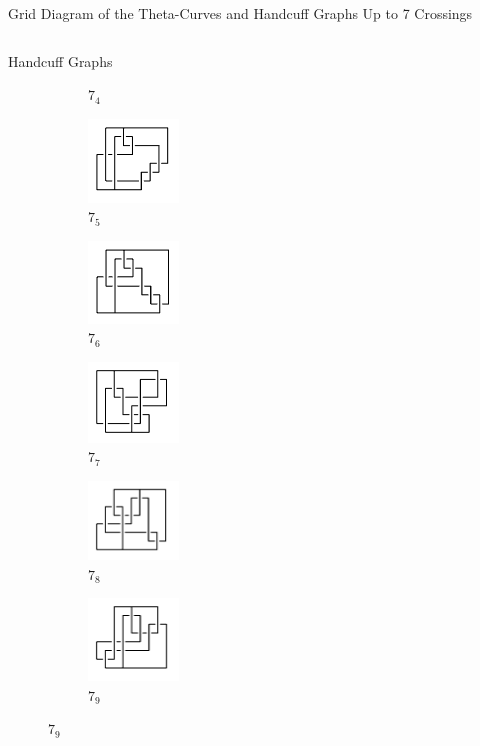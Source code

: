 \documentclass[final]{beamer}
\begin{document}
\begin{frame}[t]
\begin{alertblock}{Grid Diagram of the Theta-Curves and Handcuff Graphs Up to 7 Crossings}
\begin{columns}[t]
\begin{column}{0.3\textwidth}
\begin{alertblock}{Handcuff Graphs}
\begin{figure}
\begin{subfigure}{0.15\textwidth}
    \caption{$7_{4}$} 
    \end{subfigure}
    \begin{subfigure}{0.15\textwidth}
    \includegraphics[width=2.4cm]{../Midterm_Poster/grid_diagram/handcuff_7_5.png}
    \caption{$7_{5}$} 
    \end{subfigure}
    \begin{subfigure}{0.15\textwidth}
    \includegraphics[width=2.4cm]{../Midterm_Poster/grid_diagram/handcuff_7_6.png}
    \caption{$7_{6}$} 
    \end{subfigure}
    \begin{subfigure}{0.15\textwidth}
    \includegraphics[width=2.4cm]{../Midterm_Poster/grid_diagram/handcuff_7_7.png}
    \caption{$7_{7}$} 
    \end{subfigure}
    \begin{subfigure}{0.15\textwidth}
    \includegraphics[width=2.4cm]{../Midterm_Poster/grid_diagram/handcuff_7_8.png}
    \caption{$7_{8}$} 
    \end{subfigure}
    \begin{subfigure}{0.15\textwidth}
    \includegraphics[width=2.4cm]{../Midterm_Poster/grid_diagram/handcuff_7_9.png}
    \caption{$7_{9}$} 
    \end{subfigure}

\end{figure}
\end{alertblock}
\end{column}
\end{columns}
\end{alertblock}
\end{frame}
\end{document}
